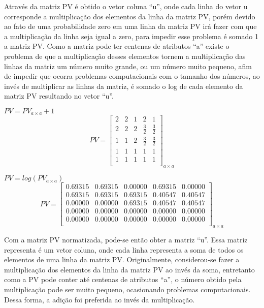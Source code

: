 \begin{anexosenv}
Através da matriz PV é obtido o vetor coluna ``u'', onde cada linha
do vetor u corresponde a multiplicação dos elementos da linha da matriz
PV, porém devido ao fato de uma probabilidade zero em uma linha da matriz
PV irá fazer com que a multiplicação da linha seja igual a zero, para
impedir esse problema é somado 1 a matriz PV. Como a matriz pode ter
centenas de atributos ``a'' existe o problema de que a multiplicação
desses elementos tornem a multiplicação das linhas da matriz um número
muito grande, ou um número muito pequeno, afim de impedir que ocorra
problemas computacionais com o tamanho dos números, ao invés de multiplicar
as linhas da matriz, é somado o log de cada elemento da matriz PV resultando
no vetor ``u''.

\begin{center}
$PV = PV_{a \times a} + 1$
$$PV=\left[
\begin{array}{ccccc}
2 & 2 & 1 & 2 & 1 \\
2 & 2 & 2 & \frac{3}{2} & \frac{3}{2} \\
1 & 1 & 2 & \frac{3}{2} & \frac{3}{2} \\
1 & 1 & 1 & 1 & 1 \\
1 & 1 & 1 & 1 & 1 \\
\end{array}
\right]_{a \times a}$$
\end{center}

\begin{center}
$PV = log(PV_{a \times a})$
$$PV=\left[
\begin{array}{ccccc}
0.69315 & 0.69315 & 0.00000 & 0.69315 & 0.00000 \\
0.69315 & 0.69315 & 0.69315 & 0.40547 & 0.40547 \\
0.00000 & 0.00000 & 0.69315 & 0.40547 & 0.40547 \\
0.00000 & 0.00000 & 0.00000 & 0.00000 & 0.00000 \\
0.00000 & 0.00000 & 0.00000 & 0.00000 & 0.00000 \\
\end{array}
\right]_{a \times a}$$
\end{center}

Com a matriz PV normatizada, pode-se então obter a matriz ``u''. Essa matriz
representa é um vetor coluna, onde cada linha representa a soma de todos os
elementos de uma linha da matriz PV. Originalmente, considerou-se fazer a
multiplicação dos elementos da linha da matriz PV ao invés da soma, entretanto
como a PV pode conter até centenas de atributos ``a'', o número obtido pela
multiplicação pode ser muito pequeno, ocasionando problemas computacionais.
Dessa forma, a adição foi preferida ao invés da multiplicação.


\end{anexosenv}
